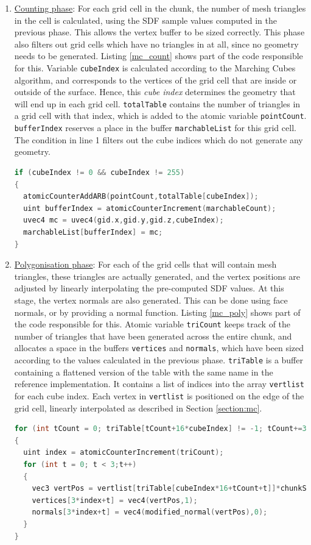 \documentclass{article}
\begin{document}
\begin{enumerate}
\item \underline{Counting phase}: For each grid cell in the chunk, the number of mesh triangles in the cell is calculated, using the SDF sample values computed in the previous phase. This allows the vertex buffer to be sized correctly. This phase also filters out grid cells which have no triangles in at all, since no geometry needs to be generated. Listing \ref{mc_count} shows part of the code responsible for this. Variable \texttt{cubeIndex} is calculated according to the Marching Cubes algorithm, and corresponds to the vertices of the grid cell that are inside or outside of the surface. Hence, this \textit{cube index} determines the geometry that will end up in each grid cell. \texttt{totalTable} contains the number of triangles in a grid cell with that index, which is added to the atomic variable \texttt{pointCount}. \texttt{bufferIndex} reserves a place in the buffer \texttt{marchableList} for this grid cell. The condition in line 1 filters out the cube indices which do not generate any geometry.
\begin{lstlisting}[language=C++,label={mc_count},caption={GLSL code for counting the number of vertices and marchable grid cells in the chunk.}]
if (cubeIndex != 0 && cubeIndex != 255)
{
  atomicCounterAddARB(pointCount,totalTable[cubeIndex]);
  uint bufferIndex = atomicCounterIncrement(marchableCount);
  uvec4 mc = uvec4(gid.x,gid.y,gid.z,cubeIndex);
  marchableList[bufferIndex] = mc;
}
\end{lstlisting}

\item \underline{Polygonisation phase}: For each of the grid cells that will contain mesh triangles, these triangles are actually generated, and the vertex positions are adjusted by linearly interpolating the pre-computed SDF values. At this stage, the vertex normals are also generated. This can be done using face normals, or by providing a normal function. Listing \ref{mc_poly} shows part of the code responsible for this. Atomic variable \texttt{triCount} keeps track of the number of triangles that have been generated across the entire chunk, and allocates a space in the buffers \texttt{vertices} and \texttt{normals}, which have been sized according to the values calculated in the previous phase. \texttt{triTable} is a buffer containing a flattened version of the table with the same name in the reference implementation. It contains a list of indices into the array \texttt{vertlist} for each cube index. Each vertex in \texttt{vertlist} is positioned on the edge of the grid cell, linearly interpolated as described in Section \ref{section:mc}.
\begin{lstlisting}[language=C++,label={mc_poly},caption={GLSL code for generating the geometry of a grid cell.}]
for (int tCount = 0; triTable[tCount+16*cubeIndex] != -1; tCount+=3)
{
  uint index = atomicCounterIncrement(triCount);
  for (int t = 0; t < 3;t++)
  {
    vec3 vertPos = vertlist[triTable[cubeIndex*16+tCount+t]]*chunkStride + chunkPosition;
    vertices[3*index+t] = vec4(vertPos,1);
    normals[3*index+t] = vec4(modified_normal(vertPos),0);
  }
}
\end{lstlisting}

\end{enumerate}
\end{document}
